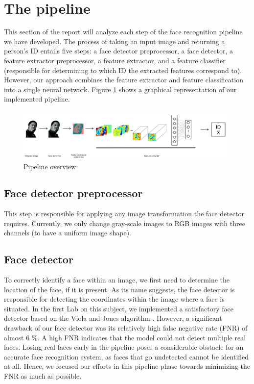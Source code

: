 \documentclass[11pt, a4paper]{article}
\numberwithin{equation}{subsection}
\begin{document}
\section{The pipeline}

This section of the report will analyze each step of the face recognition pipeline we have developed. The process of taking an input image and returning a person's ID entails five steps: a face detector preprocessor, a face detector, a feature extractor preprocessor, a feature extractor, and a feature classifier (responsible for determining to which ID the extracted features correspond to). However, our approach combines the feature extractor and feature classification into a single neural network. Figure \ref{fig:pipeline-overview} shows a graphical representation of our implemented pipeline.

\begin{figure}[H]
    \centering
    \includegraphics[width=0.98\textwidth]{images/pipeline_overview.png}
    \caption{Pipeline overview}
    \label{fig:pipeline-overview}
\end{figure}

\subsection{Face detector preprocessor}
This step is responsible for applying any image transformation the face detector requires. Currently, we only change gray-scale images to RGB images with three channels (to have a uniform image shape).

\subsection{Face detector}

To correctly identify a face within an image, we first need to determine the location of the face, if it is present. As its name suggests, the face detector is responsible for detecting the coordinates within the image where a face is situated. In the first Lab on this subject, we implemented a satisfactory face detector based on the Viola and Jones algorithm \cite{viola2004robust}. However, a significant drawback of our face detector was its relatively high false negative rate (FNR) of almost 6 \%. A high FNR indicates that the model could not detect multiple real faces. Losing real faces early in the pipeline poses a considerable obstacle for an accurate face recognition system, as faces that go undetected cannot be identified at all. Hence, we focused our efforts in this pipeline phase towards minimizing the FNR as much as possible.
\end{document}
